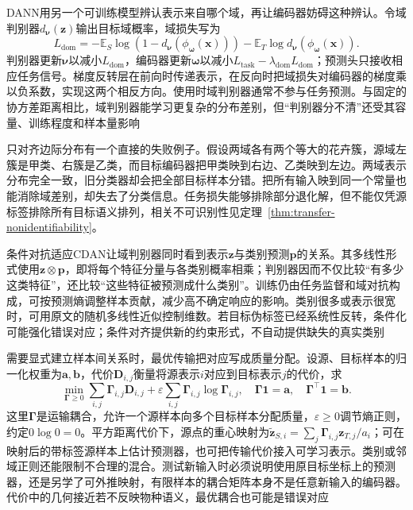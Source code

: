 DANN用另一个可训练模型辨认表示来自哪个域，再让编码器妨碍这种辨认。令域判别器$d_{\bm{\nu}}(\bm z)$输出目标域概率，域损失写为
\[
L_{\mathrm{dom}}
=-\mathbb E_S\log(1-d_{\bm{\nu}}(\phi_{\bm{\omega}}(\bm x)))
 -\mathbb E_T\log d_{\bm{\nu}}(\phi_{\bm{\omega}}(\bm x)).
\]
判别器更新$\bm{\nu}$以减小$L_{\mathrm{dom}}$，编码器更新$\bm{\omega}$以减小$L_{\mathrm{task}}-\lambda_{\mathrm{dom}}L_{\mathrm{dom}}$；预测头只接收相应任务信号。梯度反转层在前向时传递表示，在反向时把域损失对编码器的梯度乘以负系数，实现这两个相反方向。使用时域判别器通常不参与任务预测。与固定的协方差距离相比，域判别器能学习更复杂的分布差别，但“判别器分不清”还受其容量、训练程度和样本量影响

只对齐边际分布有一个直接的失败例子。假设两域各有两个等大的花卉簇，源域左簇是甲类、右簇是乙类，而目标编码器把甲类映到右边、乙类映到左边。两域表示分布完全一致，旧分类器却会把全部目标样本分错。把所有输入映到同一个常量也能消除域差别，却失去了分类信息。任务损失能够排除部分退化解，但不能仅凭源标签排除所有目标语义排列，相关不可识别性见定理~\ref{thm:transfer-nonidentifiability}。

条件对抗适应CDAN让域判别器同时看到表示$\bm z$与类别预测$\bm p$的关系。其多线性形式使用$\bm z\otimes\bm p$，即将每个特征分量与各类别概率相乘；判别器因而不仅比较“有多少这类特征”，还比较“这些特征被预测成什么类别”。训练仍由任务监督和域对抗构成，可按预测熵调整样本贡献，减少高不确定响应的影响。类别很多或表示很宽时，可用原文的随机多线性近似控制维数。若目标伪标签已经系统性反转，条件化可能强化错误对应；条件对齐提供新的约束形式，不自动提供缺失的真实类别

需要显式建立样本间关系时，最优传输把对应写成质量分配。设源、目标样本的归一化权重为$\bm a,\bm b$，代价$\bm D_{i,j}$衡量将源表示$i$对应到目标表示$j$的代价，求
\begin{equation}
\min_{\bm\Gamma\ge0}
\sum_{i,j}\bm\Gamma_{i,j}\bm D_{i,j}
+\varepsilon\sum_{i,j}\bm\Gamma_{i,j}\log\bm\Gamma_{i,j},
\quad
\bm\Gamma\bm 1=\bm a,\quad
\bm\Gamma^\top\bm1=\bm b.
\label{eq:ket-update-transport}
\end{equation}
这里$\bm\Gamma$是运输耦合，允许一个源样本向多个目标样本分配质量，$\varepsilon\ge0$调节熵正则，约定$0\log0=0$。平方距离代价下，源点的重心映射为$\tilde{\bm z}_{S,i}=\sum_j\bm\Gamma_{i,j}\bm z_{T,j}/a_i$；可在映射后的带标签源样本上估计预测器，也可把传输代价接入可学习表示。类别或邻域正则还能限制不合理的混合。测试新输入时必须说明使用原目标坐标上的预测器，还是另学了可外推映射，有限样本的耦合矩阵本身不是任意新输入的编码器。代价中的几何接近若不反映物种语义，最优耦合也可能是错误对应

